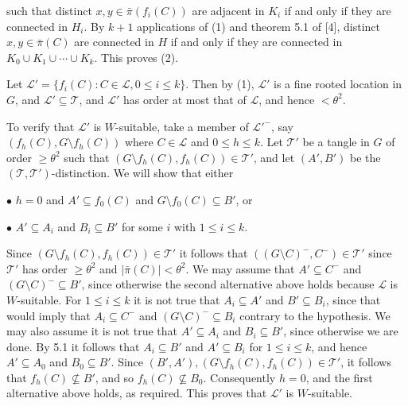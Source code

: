 \noindent such that distinct $x, y \in \bar{\pi}(f_i(C))$ are adjacent in $K_i$ if and only if they are connected in $H_i$. By $k + 1$ applications of (1) and theorem 5.1 of [4], distinct $x, y \in \bar{\pi}(C)$ are connected in $H$ if and only if they are connected in $K_0 \cup K_1 \cup \cdots \cup K_k$. This proves (2).

Let $\mathcal{L}' = \{f_i(C) : C \in \mathcal{L}, 0 \le i \le k\}$. Then by (1), $\mathcal{L}'$ is a fine rooted location in $G$, and $\mathcal{L}' \subseteq \mathcal{T}$, and $\mathcal{L}'$ has order at most that of $\mathcal{L}$, and hence $< \theta^2$.

To verify that $\mathcal{L}'$ is $W$-suitable, take a member of $\mathcal{L}'^-$, say $(f_h(C), G \setminus f_h(C))$ where $C \in \mathcal{L}$ and $0 \le h \le k$. Let $\mathcal{T}'$ be a tangle in $G$ of order $\ge \theta^2$ such that $(G \setminus f_h(C), f_h(C)) \in \mathcal{T}'$, and let $(A', B')$ be the $(\mathcal{T}, \mathcal{T}')$-distinction. We will show that either

\hspace*{12pt}$\bullet$ $h = 0$ and $A' \subseteq f_0(C)$ and $G \setminus f_0(C) \subseteq B'$, or

\hspace*{12pt}$\bullet$ $A' \subseteq A_i$ and $B_i \subseteq B'$ for some $i$ with $1 \le i \le k$.

Since $(G \setminus f_h(C), f_h(C)) \in \mathcal{T}'$ it follows that $((G \setminus C)^-, C^-) \in \mathcal{T}'$ since $\mathcal{T}'$ has order $\ge \theta^2$ and $|\bar{\pi}(C)| < \theta^2$. We may assume that $A' \subseteq C^-$ and $(G \setminus C)^- \subseteq B'$, since otherwise the second alternative above holds because $\mathcal{L}$ is $W$-suitable. For $1 \le i \le k$ it is not true that $A_i \subseteq A'$ and $B' \subseteq B_i$, since that would imply that $A_i \subseteq C^-$ and $(G \setminus C)^- \subseteq B_i$ contrary to the hypothesis. We may also assume it is not true that $A' \subseteq A_i$ and $B_i \subseteq B'$, since otherwise we are done. By 5.1 it follows that $A_i \subseteq B'$ and $A' \subseteq B_i$ for $1 \le i \le k$, and hence $A' \subseteq A_0$ and $B_0 \subseteq B'$. Since $(B', A'), (G \setminus f_h(C), f_h(C)) \in \mathcal{T}'$, it follows that $f_h(C) \nsubseteq B'$, and so $f_h(C) \nsubseteq B_0$. Consequently $h = 0$, and the first alternative above holds, as required. This proves that $\mathcal{L}'$ is $W$-suitable.

